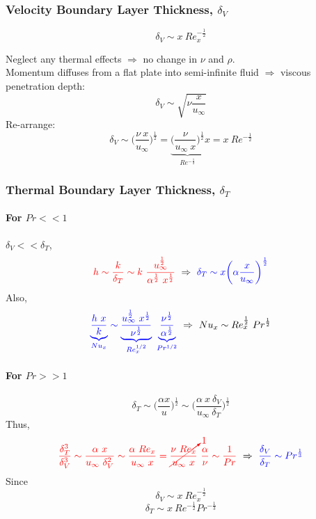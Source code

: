 \documentclass[12pt, a4paper]{article}
\numberwithin{equation}{subsection}
\begin{document}
\subsubsection{Velocity Boundary Layer Thickness, $\delta_V$}
\[
    \delta_V \sim x \ Re_{x}^{-\frac{1}{2}}
\]
\begin{tcolorbox}[breakable, title = What is the scale of $\delta_V$?]
    Neglect any thermal effects $\Rightarrow$ no change in $\nu$ and $\rho$. \\

    Momentum diffuses from a flat plate into semi-infinite fluid $\Rightarrow$ viscous penetration depth:
    \[
        \delta_V \sim \sqrt{\nu \frac{x}{u_{\infty}}}
    \]
    Re-arrange:
    \[
        \delta_V \sim \bigg( \frac{\nu \ x}{u_{\infty}} \bigg)^{\frac{1}{2}} = \underbrace{\bigg( \frac{\nu}{u_{\infty} \ x} \bigg)^{\frac{1}{2}}}_{Re^{-\frac{1}{2}}} x = \boxed{x \ Re^{-\frac{1}{2}}}
    \]
\end{tcolorbox}

\subsubsection{Thermal Boundary Layer Thickness, $\delta_T$}
\paragraph{For $Pr << 1$}
$\delta_V << \delta_T$, 
\[
    {\color{red} h \sim \frac{k}{\delta_T} \sim k \ \frac{u_{\infty}^{\frac{1}{2}}}{\alpha^{\frac{1}{2}} \ x^{\frac{1}{2}}}} \ \Rightarrow \ {\color{blue}\delta_T \sim x \bigg( \alpha \frac{x}{u_{\infty}} \bigg)^{\frac{1}{2}}}
\]
Also,
\[
    {\color{blue} \underbrace{\frac{h \ x}{k}}_{Nu_x} \sim \underbrace{\frac{u_{\infty}^{\frac{1}{2}} \ x^{\frac{1}{2}}}{\nu^{\frac{1}{2}}}}_{Re_x^{1/2}} \ \underbrace{\frac{\nu^{\frac{1}{2}}}{\alpha^{\frac{1}{2}}}}_{Pr^{1/2}}}
    \ \Rightarrow \ 
    Nu_{x} \sim Re_{x}^{\frac{1}{2}} \ Pr^{\frac{1}{2}}
\]

\paragraph{For $Pr >> 1$}
\[
    \delta_T \sim \bigg( \frac{\alpha x}{u}\bigg)^{\frac{1}{2}} \sim \bigg( \frac{\alpha \ x \ \delta_V}{u_\infty \ \delta_T}\bigg)^{\frac{1}{2}}
\]
Thus,
\[
    {\color{red}\frac{\delta_T^3}{\delta_V^3} \sim \frac{\alpha \ x}{u_\infty \ \delta_V^2} \sim \frac{\alpha \ Re_x}{u_\infty \ x} = \cancelto{1}{\frac{\nu \ Re_x}{u_\infty \ x}}\ \frac{\alpha}{\nu} \sim \frac{1}{Pr}} \ \Rightarrow \ {\color{blue}\frac{\delta_V}{\delta_T} \sim Pr^{\frac{1}{3}}}
\]
Since
\[
    \delta_V \sim x \ Re_{x}^{-\frac{1}{2}} 
\]
\[
    \delta_T \sim x \ Re^{-\frac{1}{2}} Pr^{-\frac{1}{3}}
\]
\end{document}
